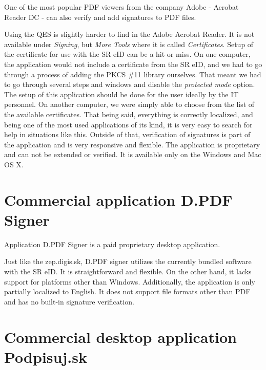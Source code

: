 \documentclass[thesismargins, english, thesislinespacing, onelinechapterstyle, upjsfrontpage]{rnthesis}
\begin{document}
One of the most popular PDF viewers from the company Adobe - Acrobat Reader DC - can also verify and add signatures to PDF files.


Using the QES is slightly harder to find in the Adobe Acrobat Reader.
It is not available under \textit{Signing}, but \textit{More Tools} where it is called \textit{Certificates}.
Setup of the certificate for use with the SR eID can be a hit or miss.
On one computer, the application would not include a certificate from the SR eID, and we had to go through a process of adding the PKCS \#11 library ourselves.
That meant we had to go through several steps and windows and disable the \textit{protected mode} option.
The setup of this application should be done for the user ideally by the IT personnel.
On another computer, we were simply able to choose from the list of the available certificates.
That being said, everything is correctly localized, and being one of the most used applications of its kind, it is very easy to search for help in situations like this.
Outside of that, verification of signatures is part of the application and is very responsive and flexible.
The application is proprietary and can not be extended or verified.
It is available only on the Windows and Mac OS X.

\section{Commercial application D.PDF Signer}

Application D.PDF Signer is a paid proprietary desktop application.


Just like the zep.digis.sk, D.PDF signer utilizes the currently bundled software with the SR eID.
It is straightforward and flexible.
On the other hand, it lacks support for platforms other than Windows.
Additionally, the application is only partially localized to English.
It does not support file formats other than PDF and has no built-in signature verification.

\section{Commercial desktop application Podpisuj.sk}
\end{document}
